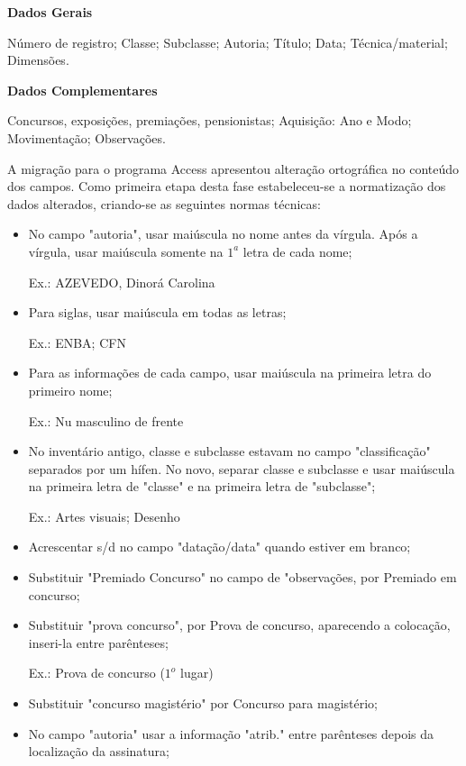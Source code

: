 \textbf{Dados Gerais}

Número de registro; Classe; Subclasse; Autoria; Título; Data; Técnica/material; Dimensões.

\textbf{Dados Complementares}

Concursos, exposições, premiações, pensionistas; Aquisição: Ano e Modo; Movimentação; Observações.

A migração para o programa Access apresentou alteração ortográfica no conteúdo dos campos. Como primeira etapa desta fase estabeleceu-se a normatização dos dados alterados, criando-se as seguintes normas técnicas:

\begin{itemize}
	\item No campo "autoria", usar maiúscula no nome antes da vírgula. Após a vírgula, usar maiúscula somente na $1^a$ letra de cada nome;
	
	Ex.: AZEVEDO, Dinorá Carolina
	
	\item Para siglas, usar maiúscula em todas as letras;
	
	Ex.: ENBA; CFN
	
	\item Para as informações de cada campo, usar maiúscula na primeira letra do primeiro nome;
	
	Ex.: Nu masculino de frente
	
	\item No inventário antigo, classe e subclasse estavam no campo "classificação" separados por um hífen. No novo, separar classe e subclasse e usar maiúscula na primeira letra de "classe" e na primeira letra de "subclasse";
	
	Ex.: Artes visuais; Desenho
	
	\item Acrescentar s/d no campo "datação/data" quando estiver em branco;
	
	\item Substituir "Premiado Concurso" no campo de "observações, por Premiado em concurso;
	
	\item Substituir "prova concurso", por Prova de concurso, aparecendo a colocação, inseri-la entre parênteses;
	
	Ex.: Prova de concurso ($1^o$ lugar)
	
	\item Substituir "concurso magistério" por Concurso para magistério;
	
	\item No campo "autoria" usar a informação "atrib." entre parênteses depois da localização da assinatura;
	

\end{itemize}
